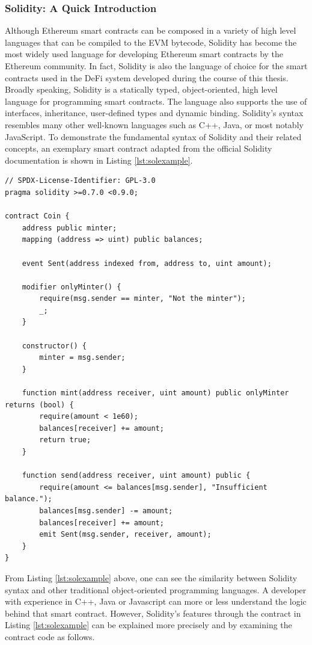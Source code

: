 \subsubsection{Solidity: A Quick Introduction} \label{subsubsec:sol}

Although Ethereum smart contracts can be composed in a variety of high level languages that can be compiled to the EVM bytecode, Solidity has become the most widely used language for developing Ethereum smart contracts by the Ethereum community. In fact, Solidity is also the language of choice for the smart contracts used in the DeFi system developed during the course of this thesis. Broadly speaking, Solidity is a statically typed, object-oriented, high level language for programming smart contracts. The language also supports the use of interfaces, inheritance, user-defined types and dynamic binding. Solidity's syntax resembles many other well-known languages such as C++, Java, or most notably JavaScript. To demonstrate the fundamental syntax of Solidity and their related concepts, an exemplary smart contract adapted from the official Solidity documentation \cite{soldocs_scintro} is shown in Listing \ref{lst:solexample}.

\begin{lstlisting}[language=Solidity, label={lst:solexample}, captionpos=b, caption={An example token smart contract in Solidity}]
// SPDX-License-Identifier: GPL-3.0
pragma solidity >=0.7.0 <0.9.0;

contract Coin {
    address public minter;
    mapping (address => uint) public balances;

    event Sent(address indexed from, address to, uint amount);
    
    modifier onlyMinter() {
        require(msg.sender == minter, "Not the minter");
        _;
    }

    constructor() {
        minter = msg.sender;
    }

    function mint(address receiver, uint amount) public onlyMinter returns (bool) {
        require(amount < 1e60);
        balances[receiver] += amount;
        return true;
    }

    function send(address receiver, uint amount) public {
        require(amount <= balances[msg.sender], "Insufficient balance.");
        balances[msg.sender] -= amount;
        balances[receiver] += amount;
        emit Sent(msg.sender, receiver, amount);
    }
}
\end{lstlisting}

From Listing \ref{lst:solexample} above, one can see the similarity between Solidity syntax and other traditional object-oriented programming languages. A developer with experience in C++, Java or Javascript can more or less understand the logic behind that smart contract. However, Solidity's features through the contract in Listing \ref{lst:solexample} can be explained more precisely and by examining the contract code as follows.

